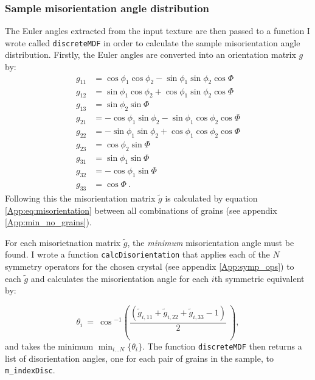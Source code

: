 \documentclass[a4paper,12pt,twoside]{report}
\numberwithin{equation}{chapter}
\begin{document}
\subsubsection{Sample misorientation angle distribution} 
The Euler angles extracted from the input texture are then passed to a function I wrote called \texttt{discreteMDF} in order to calculate the sample misorientation angle distribution. Firstly, the Euler angles are converted into an orientation matrix $g$ by:    
\begin{equation}
\begin{split}
g_{11} &= \cos{\phi_1}\cos{\phi_2} - \sin{\phi_1}\sin{\phi_2}\cos{\Phi} \\
g_{12} &= \sin{\phi_1}\cos{\phi_2} + \cos{\phi_1}\sin{\phi_2}\cos{\Phi} \\
g_{13} &= \sin{\phi_2}\sin{\Phi} \\
g_{21} &= -\cos{\phi_1}\sin{\phi_2} - \sin{\phi_1}\cos{\phi_2}\cos{\Phi} \\
g_{22} &= -\sin{\phi_1}\sin{\phi_2} + \cos{\phi_1}\cos{\phi_2}\cos{\Phi} \\
g_{23} &= \cos{\phi_2}\sin{\Phi} \\
g_{31} &= \sin{\phi_1}\sin{\Phi} \\
g_{32} &= -\cos{\phi_1}\sin{\Phi} \\
g_{33} &= \cos{\Phi}\ .
\end{split}
\end{equation}
\noindent
Following this the misorientation matrix $\tilde{g}$ is calculated by equation \ref{App:eq:misorientation} between all combinations of grains (see appendix \ref{App:min_no_grains}).

For each misorietnation matrix $\tilde{g}$, the \emph{minimum} misorientation \citep[disorientation,][]{Grimmer1979} angle must be found. I wrote a function \texttt{calcDisorientation} that applies each of the $N$ symmetry operators for the chosen crystal (see appendix \ref{App:symp_ops}) to each $\tilde{g}$ and calculates the misorientation angle for each $i$th symmetric equivalent by:   

\begin{equation}
\theta_i\ =\ \cos{}^{-1} \left( \frac{(\tilde{g}_{i,11} + \tilde{g}_{i,22} + \tilde{g}_{i,33} - 1)}{2}\ \right) ,
\end{equation}
\noindent
and takes the minimum $\displaystyle \min_{i...N}\{\theta_i\}$. The function \texttt{discreteMDF} then returns a list of disorientation angles, one for each pair of grains in the sample, to \texttt{m\_indexDisc}. 
\end{document}
